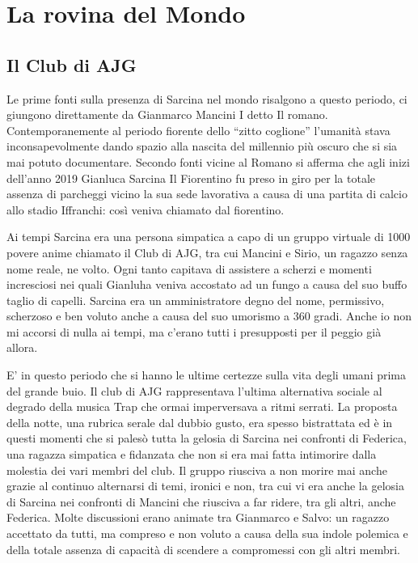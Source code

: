 \chapter{La rovina del Mondo}
\section{Il Club di AJG}
	Le prime fonti sulla presenza di Sarcina nel mondo risalgono a questo periodo, ci giungono direttamente da Gianmarco Mancini I detto Il romano. 
Contemporanemente al periodo fiorente dello “zitto coglione” l’umanità stava inconsapevolmente dando spazio alla nascita del millennio più oscuro che si sia mai potuto documentare. Secondo fonti vicine al Romano si afferma che agli inizi dell’anno 2019 Gianluca Sarcina Il Fiorentino fu preso in giro per la totale assenza di parcheggi vicino la sua sede lavorativa a causa di una partita di calcio allo stadio Iffranchi: così veniva chiamato dal fiorentino. 

Ai tempi Sarcina era una persona simpatica a capo di un gruppo virtuale di 1000 povere anime chiamato il Club di AJG, tra cui Mancini e Sirio, un ragazzo senza nome reale, ne volto. 
Ogni tanto capitava di assistere a scherzi e momenti incresciosi nei quali Gianluha veniva accostato ad un fungo a causa del suo buffo taglio di capelli. 
Sarcina era un amministratore degno del nome, permissivo, scherzoso e ben voluto anche a causa del suo umorismo a 360 gradi. 
Anche io non mi accorsi di nulla ai tempi, ma c’erano tutti i presupposti per il peggio già allora.

E' in questo periodo che si hanno le ultime certezze sulla vita degli umani prima del grande buio. Il club di AJG rappresentava l'ultima alternativa sociale al degrado della musica Trap che ormai imperversava a ritmi serrati.
La proposta della notte, una rubrica serale dal dubbio gusto, era spesso bistrattata ed è in questi momenti che si palesò tutta la gelosia di Sarcina nei confronti di Federica, una ragazza simpatica e fidanzata che non si era mai fatta intimorire dalla molestia dei vari membri del club.
Il gruppo riusciva a non morire mai anche grazie al continuo alternarsi di temi, ironici e non, tra cui vi era anche la gelosia di Sarcina nei confronti di Mancini che riusciva a far ridere, tra gli altri, anche Federica. Molte discussioni erano animate tra Gianmarco e Salvo: un ragazzo accettato da tutti, ma compreso e non voluto a causa della sua indole polemica e della totale assenza di capacità di scendere a compromessi con gli altri membri.

